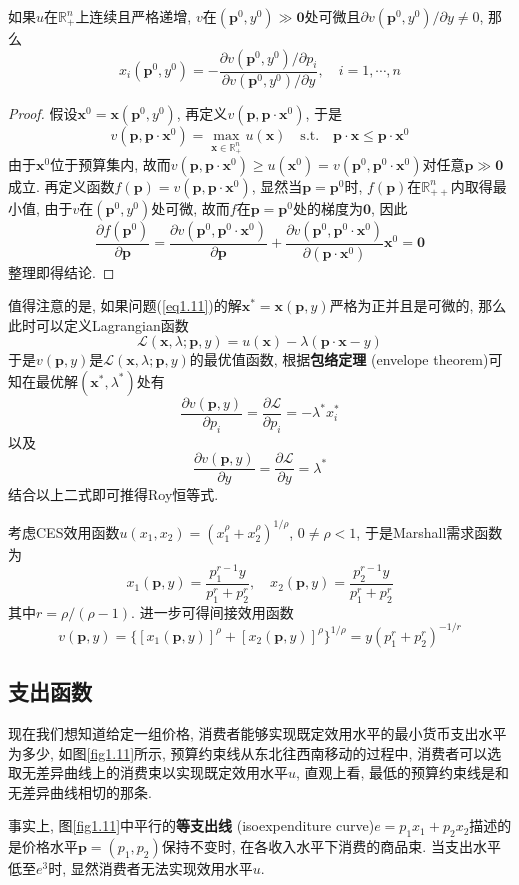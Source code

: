 \documentclass[cn, 12pt, math=mtpro2, bibstyle=apa, blue]{elegantbook}
\newcommand{\R}{\mathbb{R}}
\newcommand{\p}{\mathbf{p}}
\newcommand{\x}{\mathbf{x}}
\begin{document}
\begin{theorem}[Roy恒等式]
  如果$u$在$\R_+^n$上连续且严格递增, $v$在$(\p^0,y^0)\gg\mathbf{0}$处可微且$\partial v(\p^0,y^0)/\partial y\ne0$, 那么
  $$x_i(\p^0,y^0)=-\frac{\partial v(\p^0,y^0)/\partial p_i}{\partial v(\p^0,y^0)/\partial y},\quad i=1,\cdots,n$$
\end{theorem}
\begin{proof}
  假设$\x^0=\x(\p^0,y^0)$, 再定义$v(\p,\p\cdot\x^0)$, 于是
  $$v(\p,\p\cdot\x^0)=\max_{\x\in\R_+^n}u(\x)\quad\text{s.t.}\quad \p\cdot\x\leq \p\cdot\x^0$$
  由于$\x^0$位于预算集内, 故而$v(\p,\p\cdot\x^0)\geq u(\x^0)=v(\p^0,\p^0\cdot\x^0)$对任意$\p\gg\mathbf{0}$成立. 再定义函数$f(\p)=v(\p,\p\cdot\x^0)$, 显然当$\p=\p^0$时, $f(\p)$在$\R_{++}^n$内取得最小值, 由于$v$在$(\p^0,y^0)$处可微, 故而$f$在$\p=\p^0$处的梯度为$\mathbf{0}$, 因此
  $$\frac{\partial f(\p^0)}{\partial \p}=\frac{\partial v(\p^0,\p^0\cdot\x^0)}{\partial \p}+\frac{\partial v(\p^0,\p^0\cdot\x^0)}{\partial (\p\cdot\x^0)}\x^0=\mathbf{0}$$
  整理即得结论.
\end{proof}
值得注意的是, 如果问题(\ref{eq1.11})的解$\x^\ast=\x(\p,y)$严格为正并且是可微的, 那么此时可以定义Lagrangian函数
$$\mathcal{L}(\x,\lambda;\p,y)=u(\x)-\lambda(\p\cdot\x-y)$$
于是$v(\p,y)$是$\mathcal{L}(\x,\lambda;\p,y)$的最优值函数, 根据\textbf{包络定理} (envelope theorem)可知在最优解$(\x^\ast,\lambda^\ast)$处有
$$\frac{\partial v(\p,y)}{\partial p_i}=\frac{\partial \mathcal{L}}{\partial p_i}=-\lambda^\ast x_i^\ast$$
以及
$$\frac{\partial v(\p,y)}{\partial y}=\frac{\partial \mathcal{L}}{\partial y}=\lambda^\ast$$
结合以上二式即可推得Roy恒等式.

\begin{example}
考虑CES效用函数$u(x_1,x_2)=(x_1^\rho+x_2^\rho)^{1/\rho}$, $0\neq\rho<1$, 于是Marshall需求函数为
$$x_1(\p,y)=\frac{p_1^{r-1}y}{p_1^r+p_2^r},\quad x_2(\p,y)=\frac{p_2^{r-1}y}{p_1^r+p_2^r}$$
其中$r=\rho/(\rho-1)$. 进一步可得间接效用函数
$$v(\p,y)=\{[x_1(\p,y)]^\rho+[x_2(\p,y)]^\rho\}^{1/\rho}=y(p_1^r+p_2^r)^{-1/r}$$
\end{example}
\subsection{支出函数}
现在我们想知道给定一组价格, 消费者能够实现既定效用水平的最小货币支出水平为多少, 如图\ref{fig1.11}所示, 预算约束线从东北往西南移动的过程中, 消费者可以选取无差异曲线上的消费束以实现既定效用水平$u$, 直观上看, 最低的预算约束线是和无差异曲线相切的那条.

事实上, 图\ref{fig1.11}中平行的\textbf{等支出线 }(isoexpenditure curve)$e=p_1x_1+p_2x_2$描述的是价格水平$\p=(p_1,p_2)$保持不变时, 在各收入水平下消费的商品束. 当支出水平低至$e^3$时, 显然消费者无法实现效用水平$u$.
\end{document}
